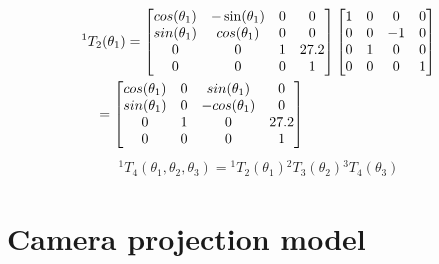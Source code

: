 \documentclass[twocolumn]{article}
\begin{document}
\begin{align}
  &{}^1T_2(\theta_1) =
    \begin{bmatrix}
      cos(\theta_1) & -\sin(\theta_1) & 0 & 0 \\
      sin(\theta_1) & cos(\theta_1) & 0 & 0 \\
      0 & 0 & 1 & 27.2 \\
      0 & 0 & 0 & 1
    \end{bmatrix}
                  \begin{bmatrix}
                    1 & 0 & 0 & 0 \\
                    0 & 0 & -1 & 0 \\
                    0 & 1 & 0 & 0 \\
                    0 & 0 & 0 & 1
                  \end{bmatrix}
                                \notag\\
  &\quad= \begin{bmatrix}
    cos(\theta_1) & 0 & sin(\theta_1) & 0 \\
    sin(\theta_1) & 0 & -cos(\theta_1) & 0 \\
    0 & 1 & 0 & 27.2 \\
    0 & 0 & 0 & 1
  \end{bmatrix}
\end{align}
\begin{align}
  {}^1T_4(\theta_1, \theta_2, \theta_3) = {}^1T_2(\theta_1) {}^2T_3(\theta_2) {}^3T_4(\theta_3)
\end{align}
\fi
\section{Camera  projection model}
\end{document}
